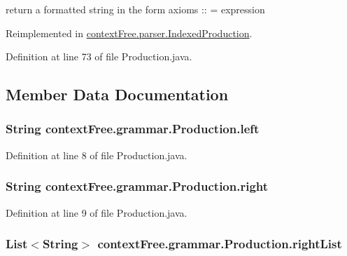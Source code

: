 return a formatted string in the form axioms \-:\-: = expression 



Reimplemented in \hyperlink{classcontext_free_1_1parser_1_1_indexed_production_a061cd84bd37e6111edcd52bcb5b9c749}{context\-Free.\-parser.\-Indexed\-Production}.



Definition at line 73 of file Production.\-java.



\subsection{Member Data Documentation}
\hypertarget{classcontext_free_1_1grammar_1_1_production_ad188a705cd57d55d32fd198e6af71f75}{
\subsubsection[{left}]{\setlength{\rightskip}{0pt plus 5cm}String {\bf context\-Free.\-grammar.\-Production.\-left}}}\label{classcontext_free_1_1grammar_1_1_production_ad188a705cd57d55d32fd198e6af71f75}


Definition at line 8 of file Production.\-java.

\hypertarget{classcontext_free_1_1grammar_1_1_production_ab72c30da44fb1fbf41b9a70bf799ef58}{
\subsubsection[{right}]{\setlength{\rightskip}{0pt plus 5cm}String {\bf context\-Free.\-grammar.\-Production.\-right}}}\label{classcontext_free_1_1grammar_1_1_production_ab72c30da44fb1fbf41b9a70bf799ef58}


Definition at line 9 of file Production.\-java.

\hypertarget{classcontext_free_1_1grammar_1_1_production_a51394e602f57b3e2f9b07d14fd01adb9}{
\subsubsection[{right\-List}]{\setlength{\rightskip}{0pt plus 5cm}List$<$String$>$ {\bf context\-Free.\-grammar.\-Production.\-right\-List}}}\label{classcontext_free_1_1grammar_1_1_production_a51394e602f57b3e2f9b07d14fd01adb9}


